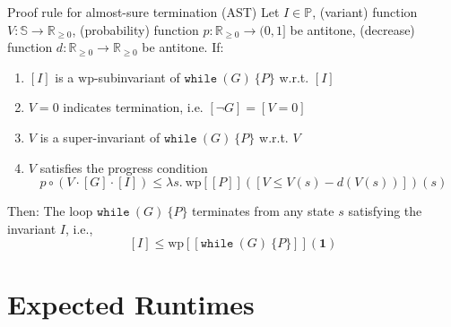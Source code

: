 \documentclass[english]{panikzettel}
\newcommand{\stmtWhile}[2]{\texttt{while}~(#1)~\{ #2 \}}
\newcommand{\lam}[1]{\lambda #1.~}
\renewcommand{\wp}{\mathrm{wp}}
\newcommand{\rel}{\mathbb{R}}
\newcommand{\relg}{\rel_{\geq 0}}
\begin{document}
\begin{theo}{Proof rule for almost-sure termination (AST)}
	Let $I \in \mathbb{P}$, (variant) function $V: \mathbb{S} \to \relg$, (probability) function $p: \relg \to (0,1]$ be antitone, (decrease) function $d: \relg \to \relg$ be antitone. If:
	\begin{enumerate}
		\item $[I]$ is a $\wp$-subinvariant of $\stmtWhile{G}{P}$ w.r.t. $[I]$
		\item $V=0$ indicates termination, i.e. $[\neg G]=[V=0]$
		\item $V$ is a super-invariant of $\stmtWhile{G}{P}$ w.r.t. $V$
		\item $V$ satisfies the progress condition
		      $$p \circ (V \cdot [G] \cdot [I]) \leq \lam{s}\wp[\![P]\!]([V \leq V(s) -d(V(s))])(s)$$
	\end{enumerate}
	Then: The loop $\stmtWhile{G}{P}$ terminates from any state $s$ satisfying the invariant $I$, i.e.,
	$$[I] \leq \wp[\![\stmtWhile{G}{P}]\!](\mathbf{1})$$
\end{theo}

\section{Expected Runtimes}
\end{document}
